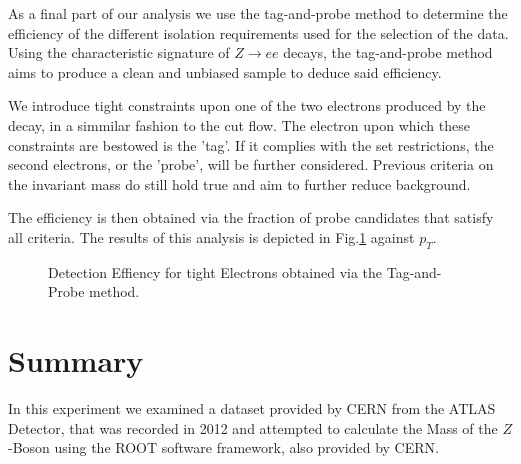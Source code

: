 \documentclass[11 pt]{article}
\begin{document}
As a final part of our analysis we use the tag-and-probe method to determine the efficiency of the different isolation requirements used for the selection of the data. Using the characteristic signature of $ Z \rightarrow ee$ decays, the tag-and-probe method aims to produce a clean and unbiased sample to deduce said efficiency.

We introduce tight constraints upon one of the two electrons produced by the decay, in a simmilar fashion to the cut flow. The electron upon which these constraints are bestowed is the 'tag'. If it complies with the set restrictions, the second electrons, or the 'probe', will be further considered. Previous criteria on the invariant mass do still hold true and aim to further reduce background.

The efficiency is then obtained via the fraction of probe candidates that satisfy all criteria. The results of this analysis is depicted in Fig.\ref{fig:detection_Efficiency} against $p_T$.

\begin{figure}[htbp]
    \centering

        \centering
    \caption{Detection Effiency for tight Electrons obtained via the Tag-and-Probe method.}
    \label{fig:detection_Efficiency}
\end{figure}

\section{Summary}
In this experiment we examined a dataset provided by CERN from the ATLAS Detector, that was recorded in 2012 and attempted to calculate the Mass of the $Z$-Boson using the ROOT software framework, also provided by CERN.
\end{document}
